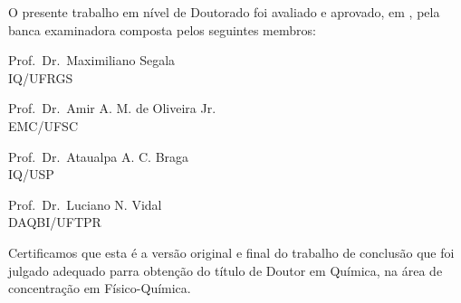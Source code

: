 %
% 
%
\begin{folhadeaprovacao}

	\begin{center}
		{\ABNTEXchapterfont\large\imprimirautor}

		\vspace*{\fill}\vspace*{\fill}
		\begin{center}
			\ABNTEXchapterfont\bfseries\Large\imprimirtitulo{}
		\end{center}
		\vspace*{\fill}

	\end{center}

	O presente trabalho em nível de Doutorado foi avaliado e aprovado, em \imprimirdata, pela banca examinadora composta pelos seguintes membros:

	\begin{center}
		Prof.\ Dr.\ Maximiliano Segala \\ IQ/UFRGS %

		Prof.\ Dr.\ Amir A. M. de Oliveira Jr. \\ EMC/UFSC

		Prof.\ Dr.\ Ataualpa A. C. Braga \\ IQ/USP

		Prof.\ Dr.\ Luciano N. Vidal \\ DAQBI/UFTPR
	\end{center}

	Certificamos que esta é a versão original e final do trabalho de conclusão que foi julgado adequado parra obtenção do título de Doutor em Química, na área de concentração em Físico-Química.


	\begin{center}
		\vspace*{0.5cm}
		{\large\imprimirlocal}
		\par
		{\large\imprimirdata}
		\vspace*{0.5cm}
	\end{center}

\end{folhadeaprovacao}
